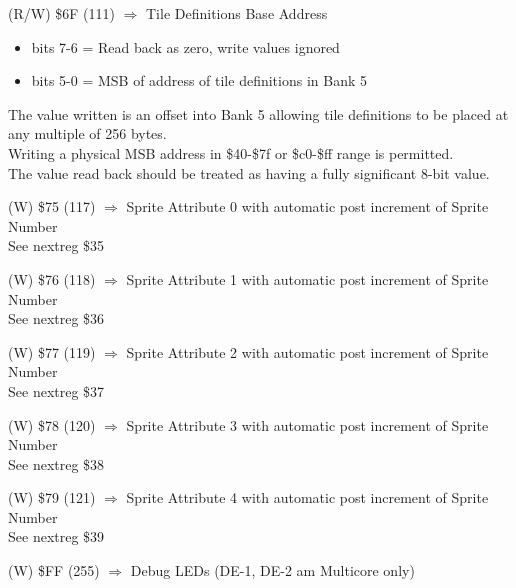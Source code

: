 (R/W) \$6F (111) $\Rightarrow$ Tile Definitions Base Address
\begin{itemize}
\item[] bits 7-6 = Read back as zero, write values ignored
\item[] bits 5-0 = MSB of address of tile definitions in Bank 5
\end{itemize}
The value written is an offset into Bank 5 allowing tile definitions
to be placed at any multiple of 256 bytes.\\
Writing a physical MSB address in \$40-\$7f or \$c0-\$ff range is
permitted.\\
The value read back should be treated as having a fully significant
8-bit value.

(W) \$75 (117) $\Rightarrow$ Sprite Attribute 0 with automatic post
increment of Sprite Number\\
See nextreg \$35

(W) \$76 (118) $\Rightarrow$ Sprite Attribute 1 with automatic post
increment of Sprite Number\\
See nextreg \$36

(W) \$77 (119) $\Rightarrow$ Sprite Attribute 2 with automatic post
increment of Sprite Number\\
See nextreg \$37

(W) \$78 (120) $\Rightarrow$ Sprite Attribute 3 with automatic post
increment of Sprite Number\\
See nextreg \$38

(W) \$79 (121) $\Rightarrow$ Sprite Attribute 4 with automatic post
increment of Sprite Number\\
See nextreg \$39

(W) \$FF (255) $\Rightarrow$ Debug LEDs (DE-1, DE-2 am Multicore only)
